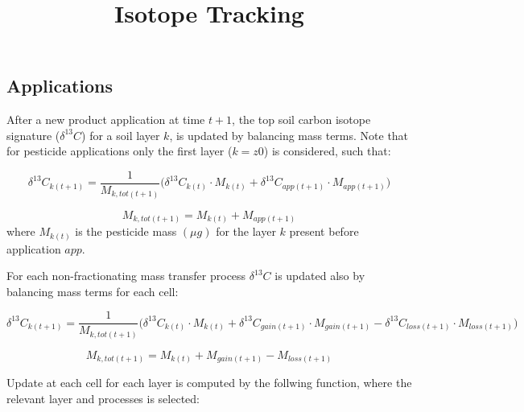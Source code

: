 \documentclass[]{article}
\title{Isotope Tracking}
\author{}
\date{}
\begin{document}
\maketitle

\hypertarget{applications}{%
\subsection{Applications}\label{applications}}

After a new product application at time \(t+1\), the top soil carbon
isotope signature (\(\delta ^{13}C\)) for a soil layer \(k\), is updated
by balancing mass terms. Note that for pesticide applications only the
first layer (\(k=z0\)) is considered, such that:

\[
\delta ^{13}C_{k(t+1)} = \frac{1}{M_{k,tot(t+1)}} \Big(\delta ^{13}C_{k(t)} \cdot M_{k(t)} + \delta ^{13}C_{app(t+1)} \cdot M_{app(t+1)}  \Big)
\]

\[
M_{k,tot(t+1)} =  M_{k(t)} + M_{app(t+1)}
\] where \(M_{k(t)}\) is the pesticide mass \((\mu g)\) for the layer
\(k\) present before application \(app\).

For each non-fractionating mass transfer process \(\delta ^{13}C\) is
updated also by balancing mass terms for each cell:

\[
\delta ^{13}C_{k(t+1)} = \frac{1}{M_{k,tot(t+1)}} \Big(\delta ^{13}C_{k(t)} \cdot M_{k(t)} + \delta ^{13}C_{gain(t+1)} \cdot M_{gain(t+1)} -  \delta ^{13}C_{loss(t+1)} \cdot M_{loss(t+1)}  \Big)
\]

\[
M_{k,tot(t+1)} =  M_{k(t)} + M_{gain(t+1)} -  M_{loss(t+1)}
\]

Update at each cell for each layer is computed by the follwing function,
where the relevant layer and processes is selected:
\end{document}
